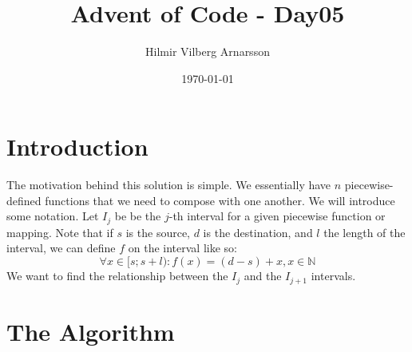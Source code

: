 \documentclass{article}
\newcommand{\N}{\mathbb N}
\begin{document}
\selectfont
\title{Advent of Code - Day05}
\author{Hilmir Vilberg Arnarsson}
\date{\today}

\maketitle
\clearpage
\setlength{\parskip}{1em}


\section*{Introduction}
The motivation behind this solution is simple.
We essentially have $n$ piecewise-defined functions that we need 
to compose with one another. We will introduce some notation.
Let $I_j$ be be the $j$-th interval for a given piecewise function or mapping. 
Note that if $s$ is the source, $d$ is the destination, and $l$ the length
of the interval, we can define $f$ on the interval like so:
$$\forall x \in [s; s+l): f(x) = (d-s) + x, x\in \N$$
We want to find the relationship between the $I_j$ and the $I_{j+1}$ intervals.
\section*{The Algorithm}
\end{document}
